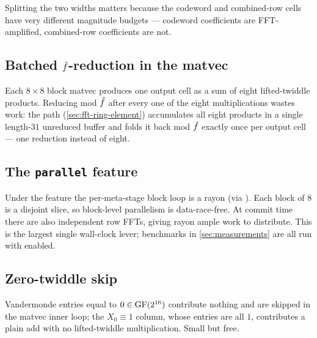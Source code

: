 Splitting the two widths matters because the codeword and combined-row
cells have very different magnitude budgets --- codeword coefficients
are FFT-amplified, combined-row coefficients are not.

\subsection{Batched $\tilde f$-reduction in the matvec}
\label{sec:opt-batched-reduce}

Each $8 \times 8$ block matvec produces one output cell as a sum of
eight lifted-twiddle products. Reducing mod $\tilde f$ after every one
of the eight multiplications wastes work: the
 path
(\autoref{sec:fft-ring-element}) accumulates all eight products in a
single length-$31$ unreduced buffer and folds it back mod $\tilde f$
exactly once per output cell --- one reduction instead of eight.

\subsection{The {\tt parallel} feature}
\label{sec:opt-parallel}

Under the  feature the per-meta-stage block loop is a
rayon  (via ). Each
block of $8$ is a disjoint slice, so block-level parallelism is
data-race-free. At commit time there are also  independent
row FFTs, giving rayon ample work to distribute. This is the largest
single wall-clock lever; benchmarks in \autoref{sec:measurements} are
all run with  enabled.

\subsection{Zero-twiddle skip}

Vandermonde entries equal to $0 \in \operatorname{GF}(2^{16})$ contribute nothing
and are skipped in the matvec inner loop; the $X_0 \equiv 1$ column,
whose entries are all $1$, contributes a plain add with no
lifted-twiddle multiplication. Small but free.
